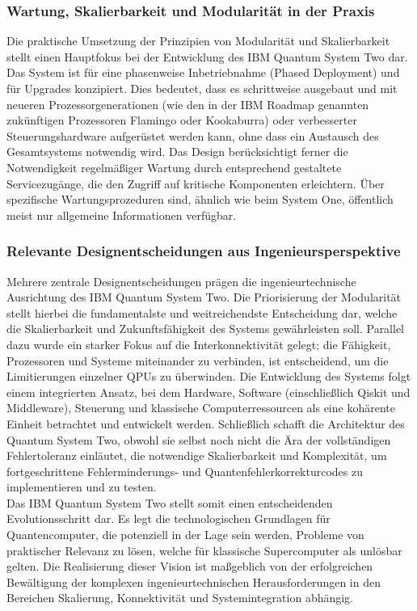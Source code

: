 \subsubsection{Wartung, Skalierbarkeit und Modularität in der Praxis}
Die praktische Umsetzung der Prinzipien von Modularität und Skalierbarkeit stellt einen Hauptfokus bei der Entwicklung des IBM Quantum System Two dar. Das System ist für eine phasenweise Inbetriebnahme (Phased Deployment) und für Upgrades konzipiert. Dies bedeutet, dass es schrittweise ausgebaut und mit neueren Prozessorgenerationen (wie den in der IBM Roadmap genannten zukünftigen Prozessoren Flamingo oder Kookaburra) oder verbesserter Steuerungshardware aufgerüstet werden kann, ohne dass ein Austausch des Gesamtsystems notwendig wird. Das Design berücksichtigt ferner die Notwendigkeit regelmäßiger Wartung durch entsprechend gestaltete Servicezugänge, die den Zugriff auf kritische Komponenten erleichtern. Über spezifische Wartungsprozeduren sind, ähnlich wie beim System One, öffentlich meist nur allgemeine Informationen verfügbar.

\subsubsection{Relevante Designentscheidungen aus Ingenieursperspektive}
Mehrere zentrale Designentscheidungen prägen die ingenieurtechnische Ausrichtung des IBM Quantum System Two. Die Priorisierung der Modularität stellt hierbei die fundamentalste und weitreichendste Entscheidung dar, welche die Skalierbarkeit und Zukunftsfähigkeit des Systems gewährleisten soll. Parallel dazu wurde ein starker Fokus auf die Interkonnektivität gelegt; die Fähigkeit, Prozessoren und Systeme miteinander zu verbinden, ist entscheidend, um die Limitierungen einzelner QPUs zu überwinden. Die Entwicklung des Systems folgt einem integrierten Ansatz, bei dem Hardware, Software (einschließlich Qiskit und Middleware), Steuerung und klassische Computerressourcen als eine kohärente Einheit betrachtet und entwickelt werden. Schließlich schafft die Architektur des Quantum System Two, obwohl sie selbst noch nicht die Ära der vollständigen Fehlertoleranz einläutet, die notwendige Skalierbarkeit und Komplexität, um fortgeschrittene Fehlerminderungs- und Quantenfehlerkorrekturcodes zu implementieren und zu testen.
\\

Das IBM Quantum System Two stellt somit einen entscheidenden Evolutionsschritt dar. Es legt die technologischen Grundlagen für Quantencomputer, die potenziell in der Lage sein werden, Probleme von praktischer Relevanz zu lösen, welche für klassische Supercomputer als unlösbar gelten. Die Realisierung dieser Vision ist maßgeblich von der erfolgreichen Bewältigung der komplexen ingenieurtechnischen Herausforderungen in den Bereichen Skalierung, Konnektivität und Systemintegration abhängig.


\printbibliography
